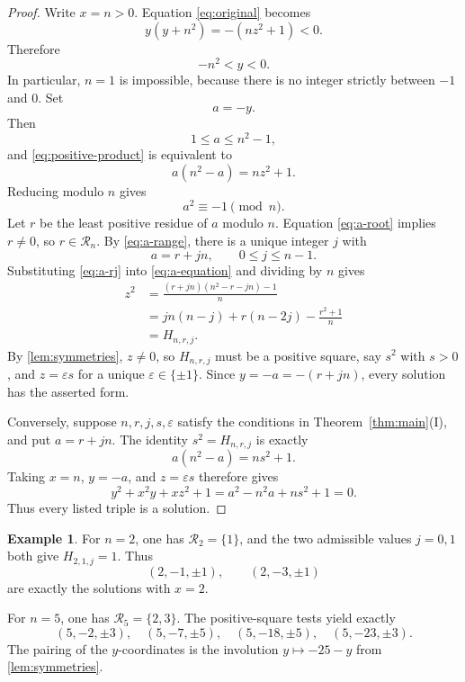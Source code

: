 \documentclass[a4paper,11pt]{amsart}
\theoremstyle{definition}
\newtheorem{example}[example]{Example}
\theoremstyle{remark}
\newcommand{\eps}{\varepsilon}
\begin{document}
\begin{proof}
Write $x=n>0$.  Equation \eqref{eq:original} becomes
\begin{equation}\label{eq:positive-product}
y(y+n^2)=-(nz^2+1)<0.
\end{equation}
Therefore
\[
-n^2<y<0.
\]
In particular, $n=1$ is impossible, because there is no integer strictly between $-1$ and $0$.  Set
\[
a=-y.
\]
Then
\begin{equation}\label{eq:a-range}
1\le a\le n^2-1,
\end{equation}
and \eqref{eq:positive-product} is equivalent to
\begin{equation}\label{eq:a-equation}
a(n^2-a)=nz^2+1.
\end{equation}
Reducing modulo $n$ gives
\begin{equation}\label{eq:a-root}
a^2\equiv-1\pmod n.
\end{equation}
Let $r$ be the least positive residue of $a$ modulo $n$.  Equation \eqref{eq:a-root} implies $r\ne0$, so $r\in\mathcal R_n$.  By \eqref{eq:a-range}, there is a unique integer $j$ with
\begin{equation}\label{eq:a-rj}
a=r+jn,
\qquad 0\le j\le n-1.
\end{equation}
Substituting \eqref{eq:a-rj} into \eqref{eq:a-equation} and dividing by $n$ gives
\begin{align*}
z^2
&=\frac{(r+jn)(n^2-r-jn)-1}{n}\\
&=jn(n-j)+r(n-2j)-\frac{r^2+1}{n}\\
&=H_{n,r,j}.
\end{align*}
By \cref{lem:symmetries}, $z\ne0$, so $H_{n,r,j}$ must be a positive square, say $s^2$ with $s>0$, and $z=\eps s$ for a unique $\eps\in\{\pm1\}$.  Since $y=-a=-(r+jn)$, every solution has the asserted form.

Conversely, suppose $n,r,j,s,\eps$ satisfy the conditions in Theorem~\ref{thm:main}\textup{(I)}, and put $a=r+jn$.  The identity $s^2=H_{n,r,j}$ is exactly
\[
a(n^2-a)=ns^2+1.
\]
Taking $x=n$, $y=-a$, and $z=\eps s$ therefore gives
\[
y^2+x^2y+xz^2+1
 =a^2-n^2a+ns^2+1
 =0.
\]
Thus every listed triple is a solution.
\end{proof}

\begin{example}\label{ex:positive-small}
For $n=2$, one has $\mathcal R_2=\{1\}$, and the two admissible values $j=0,1$ both give $H_{2,1,j}=1$.  Thus
\[
(2,-1,\pm1),
\qquad
(2,-3,\pm1)
\]
are exactly the solutions with $x=2$.

For $n=5$, one has $\mathcal R_5=\{2,3\}$.  The positive-square tests yield exactly
\[
(5,-2,\pm3),\quad
(5,-7,\pm5),\quad
(5,-18,\pm5),\quad
(5,-23,\pm3).
\]
The pairing of the $y$-coordinates is the involution $y\mapsto-25-y$ from \cref{lem:symmetries}.
\end{example}
\end{document}
